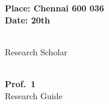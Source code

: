 \noindent \parbox{2.0in}{
	\noindent \bf Place: Chennai 600 036\\
	\noindent \bf Date: 20th \MyDate \\ 
}
\noindent \parbox{2.4in}{
\begin{flushright}
	\noindent \textbf{\MyAuthor} \\
	\noindent Research Scholar \\
\end{flushright}
}
\noindent \hspace*{3.3in}
\parbox{2.4in}{
\begin{flushright}
	\noindent \\
	\noindent \textbf{Prof.~1} \\
	\noindent Research Guide \\ %
\end{flushright}
}




